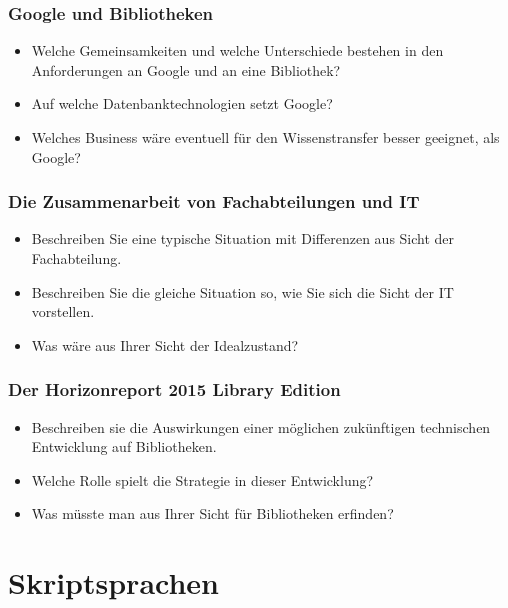   \begin{frame}
    \frametitle{Google und Bibliotheken}
      \begin{itemize}
        \item Welche Gemeinsamkeiten und welche Unterschiede bestehen in den Anforderungen an Google und an eine Bibliothek?
        \item Auf welche Datenbanktechnologien setzt Google?
        \item Welches Business wäre eventuell für den Wissenstransfer besser geeignet, als Google?
    \end{itemize}
  \end{frame}

  \begin{frame}
    \frametitle{Die Zusammenarbeit von Fachabteilungen und IT}
      \begin{itemize}
        \item Beschreiben Sie eine typische Situation mit Differenzen aus Sicht der Fachabteilung.
        \item Beschreiben Sie die gleiche Situation so, wie Sie sich die Sicht der IT vorstellen.
        \item Was wäre aus Ihrer Sicht der Idealzustand?
      \end{itemize}
  \end{frame}

  \begin{frame}
    \frametitle{Der Horizonreport 2015 Library Edition}
      \begin{itemize}
        \item Beschreiben sie die Auswirkungen einer möglichen zukünftigen technischen Entwicklung auf Bibliotheken.
        \item Welche Rolle spielt die Strategie in dieser Entwicklung?
        \item Was müsste man aus Ihrer Sicht für Bibliotheken erfinden?
      \end{itemize}
  \end{frame}

\section{Skriptsprachen}

